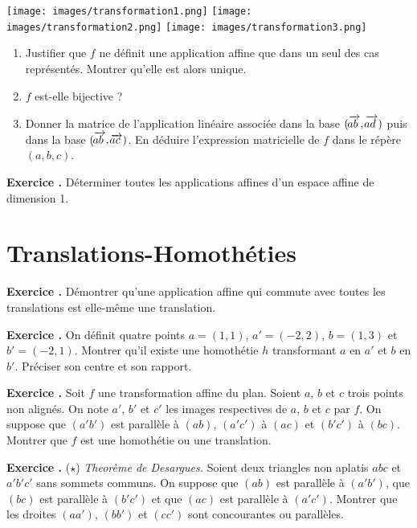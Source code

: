 \documentclass[10pt,a4paper]{article}
\def\bf#1{\textbf{#1}}
\newcounter{nexo}
\newcommand{\exo}{\medskip\noindent \bf{ Exercice \thenexo. \stepcounter{nexo}}}
\def\vect#1{\overrightarrow{\kern-1pt#1\kern 2pt}}
\begin{document}
\centerline{\texttt{[image: images/transformation1.png]}
\texttt{[image: images/transformation2.png]}
\texttt{[image: images/transformation3.png]}}
\begin{enumerate}
\item Justifier que $f$ ne d\'efinit  une application affine  que dans un seul des cas repr\'esent\'es.  Montrer qu'elle est alors unique. 
\item $f$ est-elle bijective ?
\item Donner la matrice de l'application lin\'eaire associ\'ee dans la base $(\vect{ab},\vect{ad})$ puis dans la base $(\vect{ab},\vect{ac})$. En d\'eduire l'expression matricielle de $f$ dans le r\'ep\`ere $(a,b,c)$. \end{enumerate}  

\medskip

\exo
D\'eterminer toutes les applications affines d'un espace affine de dimension 1.




 \section{Translations-Homoth\'eties}
 
\exo
D\'emontrer qu'une application affine qui commute avec toutes les translations est elle-même une translation.

\medskip

\exo
On d\'efinit quatre points  $a=(1,1)$, $a'=(-2,2)$, $b=(1,3)$ et $b'=(-2,1)$. Montrer qu'il existe une homoth\'etie $h$ transformant $a$ en $a'$ et $b$ en $b'$. Pr\'eciser son centre et son rapport.

\medskip

\exo 
Soit $f$ une transformation affine du plan. Soient $a$, $b$ et $c$ trois points non align\'es. 
On note $a'$, $b'$ et $c'$ les images respectives de $a$,
$b$ et $c$ par $f$. On suppose que $(a'b')$ est parall\`ele \`a
$(ab)$, $(a'c')$ \`a $(ac)$ et $(b'c')$ \`a $(bc)$. Montrer que $f$ est une
homoth\'etie ou une translation.

\medskip

\exo ($\star$) \textit{Theor\`eme de Desargues. } 
Soient deux triangles non aplatis $abc$ et $a'b'c'$ sans sommets communs. 
On suppose
que $(ab)$ est parall\`ele \`a $(a'b')$, que $(bc)$ est parall\`ele \`a $(b'c')$ et
que $(ac)$ est parall\`ele \`a $(a'c')$. Montrer que les droites $(aa')$,
$(bb')$ et $(cc')$ sont concourantes ou parall\`eles.
\end{document}
